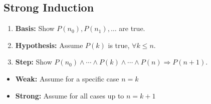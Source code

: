 \subsection{Strong Induction}
\begin{process}
    \begin{enumerate}
        \item \textbf{Basis:} Show \( P(n_0), P(n_1), \ldots \) are true.
        \item \textbf{Hypothesis:} Assume \( P(k) \) is true, \( \forall k \leq n \).
        \item \textbf{Step:} Show \( P(n_0) \land \cdots \land P(k) \land \cdots \land P(n) \Rightarrow P(n+1) \).
    \end{enumerate}    
\end{process}

\begin{warning}
    \begin{itemize}
        \item \textbf{Weak:} Assume for a specific case $n=k$
        \item \textbf{Strong:} Assume for all cases up to $n=k+1$
    \end{itemize}
\end{warning}

